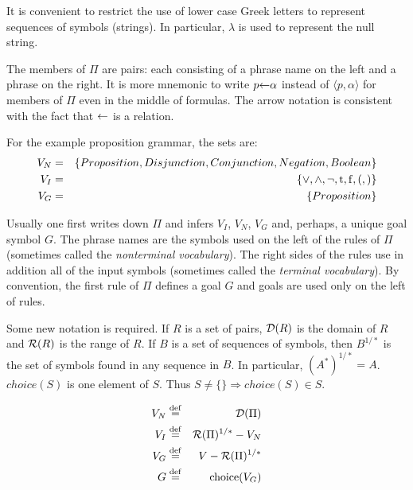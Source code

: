 \begin{enumerate}
\noindent
It is convenient to restrict the use of lower case Greek letters to
represent sequences of symbols (strings).  In particular, $\lambda$ is
used to represent the null string.

The members of $\Pi$ are pairs: 
each consisting of a phrase name on the left and a phrase on the right.  
It is more mnemonic to write $p\mbox{$\leftarrow$}\alpha$ 
instead of $\langle p,\alpha\rangle$ for members of $\Pi$
even in the middle of formulas.  
The arrow notation is consistent with the fact that $\mbox{$\leftarrow$}$ is a relation.

For the example proposition grammar, the sets are:
\begin{eqnarray*}
     V_N   &=& \{Proposition,Disjunction,Conjunction,Negation,Boolean\}\\
     V_I   &=& \{\vee,\wedge,\neg,{\rm t},{\rm f},{\rm (},{\rm )}\}	   \\
     V_G	 &=& \{Proposition\}			                                   \\
\end{eqnarray*}

Usually one first writes down $\Pi$ and infers $V_I$, $V_N$, $V_G$ and, 
perhaps, a unique goal symbol $G$. 
The phrase names are the symbols used on the left of the rules of $\Pi$ 
(sometimes called the {\em nonterminal vocabulary}).  
The right sides of the rules use in addition all of
the input symbols (sometimes called the {\em terminal vocabulary}).  
By convention, the first rule of $\Pi$ defines a goal $G$ 
and goals are used only on the left of 
rules.

Some new notation is required.  
If $R$ is a set of pairs, ${\cal D}(R)$ is the domain 
of $R$ and ${\cal R}(R)$ is the range of $R$. 
If $B$ is a set of sequences of symbols, 
then $B^{1/*}$ is the set of symbols found in any sequence in $B$.  
In particular, $(A^*)^{1/*} = A$.
$choice(S)$ is one element of $S$.
Thus $S\ne \{\} \Rightarrow choice(S) \in S$.

\begin{samepage}
\begin{eqnarray*}
   V_N        &\stackrel{\rm def}{=}&    {\cal D}(\Pi)               \\
   V_I        &\stackrel{\rm def}{=}&    {\cal R}(\Pi)^{1/*} - V_N   \\
   V_G        &\stackrel{\rm def}{=}&    V - {\cal R}(\Pi)^{1/*}     \\
   G          &\stackrel{\rm def}{=}&    {\rm choice}(V_G)
\end{eqnarray*}
\end{samepage}


\end{enumerate}

